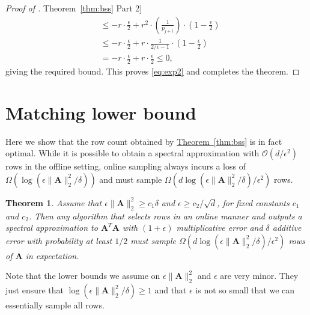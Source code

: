 \documentclass[11pt]{article}
\numberwithin{equation}{section}
\newtheorem{theorem}{Theorem}[section]
\theoremstyle{definition}
\theoremstyle{plain}
\newcommand{\expref}[2]{\hyperref[#2]{#1~\ref{#2}}}
\newcommand{\Oh}{\ensuremath{\mathcal{O}}}
\newcommand{\bv}[1]{\mathbf{#1}}
\newcommand{\norm}[1]{\|#1\|}
\begin{document}
\begin{proof}[Proof of \expref{Theorem}{thm:bss} Part 2]
\begin{align*}
 & \le  -r \cdot \frac{\epsilon}{2} + r^2 \cdot \left (\frac{1}{p_{j+1}}\right ) \cdot \left (1-\frac{\epsilon}{2}\right)\\
 & \le  -r \cdot \frac{\epsilon}{2} + r \cdot \frac{1}{2/\epsilon-1} \cdot \left (1-\frac{\epsilon}{2}\right)\\
  & =  -r \cdot \frac{\epsilon}{2} + r \cdot \frac{\epsilon}{2} \le 0,
 \end{align*}
 giving the required bound. This proves \eqref{eq:exp2} and completes the theorem.
%
%
%
%
%
%
%
%
%
\end{proof}


\section{Matching lower bound}
\label{sec:lower}

Here we show that the row count obtained by \expref{Theorem}{thm:bss} is in fact optimal. While it is possible to obtain a spectral approximation with $\Oh(d/\epsilon^2)$ rows in the offline setting, online sampling always incurs a loss of $\Omega \left (\log(\epsilon\norm{\bv A}^2_2/\delta) \right)$ and must sample $\Omega \left (d\log(\epsilon\norm{\bv A}^2_2/\delta)/\epsilon^2 \right)$ rows.

\begin{theorem}
	\label{thm:lower_bound}
	Assume that $\epsilon \norm{\bv{A}}_2^2 \ge c_1\delta$ and $\epsilon \ge c_2/\sqrt{d}$, for fixed constants $c_1$ and $c_2$.
	Then any algorithm that selects rows in an online manner and outputs a spectral approximation to $\bv{A}^T\bv{A}$ with $(1+\epsilon)$ multiplicative  error and $\delta$ additive error with probability at least $1/2$ must sample $\Omega \left (d\log(\epsilon\norm{\bv A}^2_2/\delta)/\epsilon^2 \right)$ rows of $\bv{A}$ in expectation.
\end{theorem}

Note that the lower bounds we assume on $\epsilon \norm{\bv{A}}_2^2$ and $\epsilon$ are very minor. They just ensure that $\log(\epsilon\norm{\bv A}^2_2/\delta) \ge 1$ and that $\epsilon$ is not so small that we can essentially sample all rows.
\end{document}

